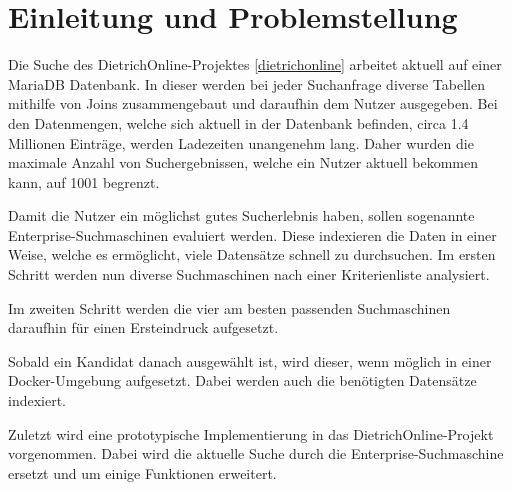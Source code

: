 \chapter{Einleitung und Problemstellung}


Die Suche des DietrichOnline-Projektes \ref{dietrichonline} arbeitet aktuell auf einer MariaDB Datenbank. In dieser werden bei jeder Suchanfrage diverse Tabellen mithilfe von Joins zusammengebaut und daraufhin dem Nutzer ausgegeben. Bei den Datenmengen, welche sich aktuell in der Datenbank befinden, circa 1.4 Millionen Einträge, werden Ladezeiten unangenehm lang. Daher wurden die maximale Anzahl von Suchergebnissen, welche ein Nutzer aktuell bekommen kann, auf 1001 begrenzt. 

Damit die Nutzer ein möglichst gutes Sucherlebnis haben, sollen sogenannte Enterprise-Suchmaschinen evaluiert werden. Diese indexieren die Daten in einer Weise, welche es ermöglicht, viele Datensätze schnell zu durchsuchen. Im ersten Schritt werden nun diverse Suchmaschinen nach einer Kriterienliste analysiert.

Im zweiten Schritt werden die vier am besten passenden Suchmaschinen daraufhin für einen Ersteindruck aufgesetzt.

Sobald ein Kandidat danach ausgewählt ist, wird dieser, wenn möglich in einer Docker-Umgebung aufgesetzt. Dabei werden auch die benötigten Datensätze indexiert.

Zuletzt wird eine prototypische Implementierung in das DietrichOnline-Projekt vorgenommen. Dabei wird die aktuelle Suche durch die Enterprise-Suchmaschine ersetzt und um einige Funktionen erweitert. 